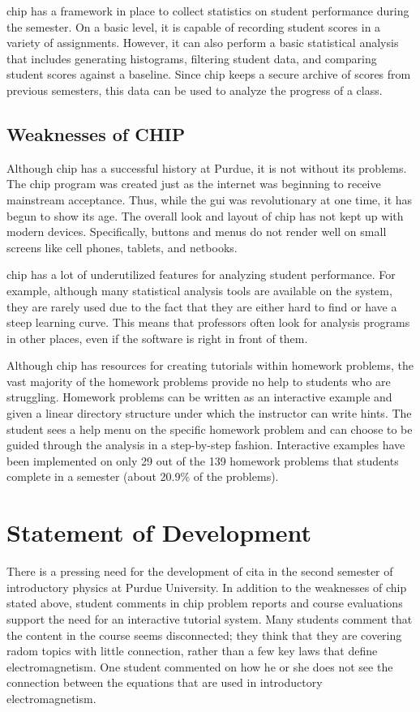 \gls{chip} has a framework in place to collect statistics on student performance during the semester. On a basic level, it is capable of recording student scores in a variety of assignments. However, it can also perform a basic statistical analysis that includes generating histograms, filtering student data, and comparing student scores against a baseline. Since \gls{chip} keeps a secure archive of scores from previous semesters, this data can be used to analyze the progress of a class.

\subsection{Weaknesses of CHIP}

Although \gls{chip} has a successful history at Purdue, it is not without its problems. The \gls{chip} program was created just as the internet was beginning to receive mainstream acceptance. Thus, while the \gls{gui} was revolutionary at one time, it has begun to show its age. The overall look and layout of \gls{chip} has not kept up with modern devices. Specifically, buttons and menus do not render well on small screens like cell phones, tablets, and netbooks.

\gls{chip} has a lot of underutilized features for analyzing student performance. For example, although many statistical analysis tools are available on the system, they are rarely used due to the fact that they are either hard to find or have a steep learning curve. This means that professors often look for analysis programs in other places, even if the software is right in front of them.

Although \gls{chip} has resources for creating tutorials within homework problems, the vast majority of the homework problems provide no help to students who are struggling. Homework problems can be written as an interactive example and given a linear directory structure under which the instructor can write hints. The student sees a help menu on the specific homework problem and can choose to be guided through the analysis in a step-by-step fashion. Interactive examples have been implemented on only 29 out of the 139 homework problems that students complete in a semester (about 20.9\% of the problems).

\section{Statement of Development}

There is a pressing need for the development of \gls{cita} in the second semester of introductory physics at Purdue University. In addition to the weaknesses of \gls{chip} stated above, student comments in \gls{chip} problem reports and course evaluations support the need for an interactive tutorial system. Many students comment that the content in the course seems disconnected; they think that they are covering radom topics with little connection, rather than a few key laws that define electromagnetism. One student commented on how he or she does not see the connection between the equations that are used in introductory electromagnetism.

